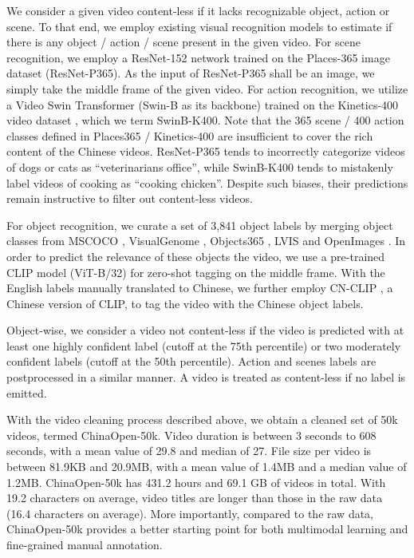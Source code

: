 We consider a given video content-less if it lacks recognizable object, action or scene. To that end, we employ existing visual recognition models to estimate if there is any object / action / scene present in the given video. For scene recognition, we employ a ResNet-152 network trained on the Places-365 image dataset \cite{places365} (ResNet-P365). As the input of ResNet-P365 shall be an image, we simply take the middle frame of the given video. For action recognition, we utilize a Video Swin Transformer (Swin-B as its backbone) \cite{k400-swint} trained on the Kinetics-400 video dataset \cite{k400}, which we term SwinB-K400. Note that the 365 scene / 400 action classes defined in Places365 / Kinetics-400 are insufficient to cover the rich content of the Chinese videos. ResNet-P365 tends to incorrectly categorize videos of dogs or cats as ``veterinarians office'', while SwinB-K400 tends to mistakenly label videos of cooking as ``cooking chicken''. Despite such biases, their predictions remain instructive to filter out content-less videos.

For object recognition, we curate a set of 3,841 object labels by merging object classes from  MSCOCO \cite{mscoco}, VisualGenome \cite{visualgenome2017}, Objects365 \cite{Objects365}, LVIS \cite{LVIS2019} and OpenImages \cite{OpenImages}. In order to predict the relevance of these objects \wrt the video, we use a pre-trained CLIP model (ViT-B/32) \cite{clip} for zero-shot tagging on the middle frame. With the English labels manually translated to Chinese, we further employ CN-CLIP \cite{cnclip}, a Chinese version of CLIP, to tag the video with the Chinese object labels. 


Object-wise, we consider a video not content-less if the video is predicted with at least one highly confident label (cutoff at the 75th percentile) or two moderately confident labels (cutoff at the 50th percentile). Action and scenes labels are postprocessed in a similar manner. A video is treated as content-less if no label is emitted.



With the video cleaning process described above, we obtain a cleaned set of 50k videos, termed ChinaOpen-50k. Video duration is between 3 seconds to 608 seconds, with a mean value of 29.8 and median of 27. File size per video is between 81.9KB and 20.9MB, with a mean value of 1.4MB and a median value of 1.2MB. ChinaOpen-50k has 431.2 hours and 69.1 GB of videos in total. With 19.2 characters on average, video titles are longer than those in the raw data (16.4 characters on average). More importantly, compared to the raw data, ChinaOpen-50k provides a better starting point for both multimodal learning and fine-grained manual annotation. 


